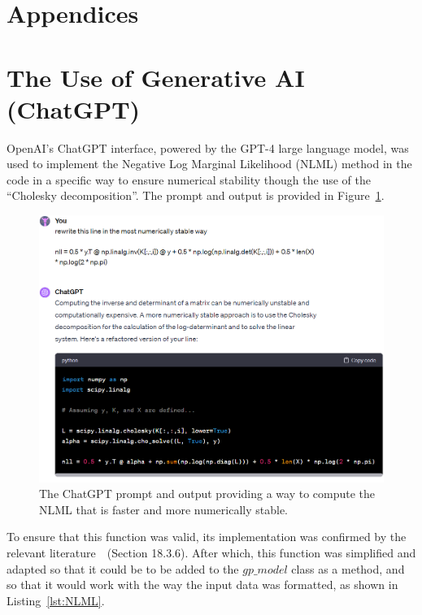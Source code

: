 \appendix

\section*{Appendices}
\renewcommand{\thelstlisting}{\thesection.\arabic{lstlisting}}
\renewcommand{\thesection}{\Alph{section}.\arabic{section}}
\setcounter{lstlisting}{0}
\section{The Use of Generative AI (ChatGPT)}
\label{app:GPT}
OpenAI's ChatGPT interface, powered by the GPT-4 large language model, was used to implement the Negative Log Marginal Likelihood (NLML) method in the code in a specific way to ensure numerical stability though the use of the ``Cholesky decomposition''.
The prompt and output is provided in Figure~\ref{fig:chat-NLML}.
\begin{figure}[htbp]
    \centering
    \includegraphics[width=1\linewidth]{figures/chat-NLML/chat-NLML.png}
    \caption{The ChatGPT prompt and output providing a way to compute the NLML that is faster and more numerically stable.}
    \label{fig:chat-NLML}
\end{figure}

\FloatBarrier

To ensure that this function was valid, its implementation was confirmed by the relevant literature~\cite{murphy2023probabilistic}~(Section 18.3.6).
After which, this function was simplified and adapted so that it could be to be added to the $gp\_model$ class as a method, and so that it would work with the way the input data was formatted, as shown in Listing~\ref{lst:NLML}.

